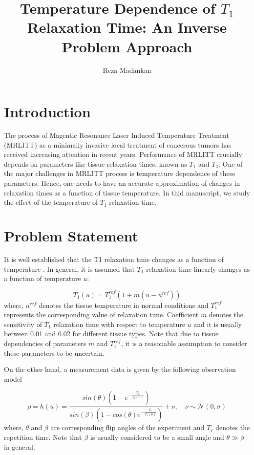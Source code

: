 \documentclass[3p,times]{article}
\begin{document}
\title{Temperature Dependence of $T_1$ Relaxation Time: An Inverse Problem Approach}
\author{Reza Madankan}
\date{}

\maketitle

\section*{Introduction}\label{sec:intro}
The process of Magentic Resonance Laser Induced Temperature Treatment (MRLITT) as a minimally invasive local treatment of cancerous tumors has received increasing attention in recent years. Performance of MRLITT crucially depends on parameters like tissue relaxation times, known as $T_1$ and $T_2$. One of the major challenges in MRLITT process is temperature dependence of these parameters. Hence, one needs to have an accurate approximation of changes in relaxation times as a function of tissue temperature. In thid manuscript, we study the effect of the temperature of $T_1$ relaxation time. 

\section*{Problem Statement}\label{sec:prob}
It is well established that the T1 relaxation time changes as a function of temperature \cite{rieke2008mr}. In general, it is assumed that $T_1$ relaxation time linearly changes as a function of temperature $u$:

\begin{equation}\label{T1model}
T_1(u)=T_1^{ref}\left(1+m(u-u^{ref})\right)
\end{equation}
where, $u^{ref}$ denotes the tissue temperature in normal conditions and $T_1^{ref}$ represents the corresponding value of relaxation time. Coefficient $m$ denotes the sensitivity of $T_1$ relaxation time with respect to temperature $u$ and it is usually between 0.01 and 0.02 for different tissue types. Note that due to tissue dependencies of parameters $m$ and $T_1^{ref}$, it is a reasonable assumption to consider these parameters to be uncertain.

On the other hand, a measurement data is given by the following observation model

\begin{equation}
\rho = h(u)=\frac{sin(\theta)\left(1-e^{-\frac{T_r}{T_1(u)}}\right)}{sin(\beta)\left(1-cos(\theta)e^{-\frac{T_r}{T_1(u)}}\right)}+\nu,\quad \nu \sim \mathcal{N}(0,\sigma)
\end{equation}
where, $\theta$ and $\beta$ are corresponding flip angles of the experiment and $T_r$ denotes the repetition time. Note that $\beta$ is usually considered to be a small angle and $\theta \gg  \beta$ in general. 
\end{document}

